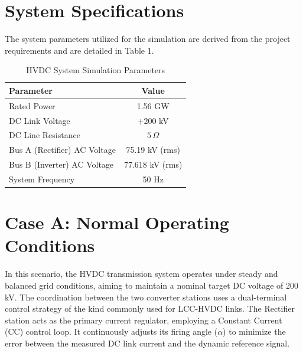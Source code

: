 \documentclass[12pt, a4paper]{article}
\begin{document}
\newpage

\begin{abstract}
	This report presents the modeling and simulation of a 1.56 GW, 200 kV 12-pulse Line-Commutated Converter (LCC) HVDC transmission system. The study evaluates the system's dynamic performance under normal operating conditions utilizing Constant Current (CC) and Constant Extinction Angle (CEA) control strategies. Furthermore, the system's resilience is tested under a severe 25\% AC voltage sag at the rectifier side, demonstrating a successful automated control handover mechanism to Constant Ignition Angle (CIA) and Inverter CC mode.
\end{abstract}

\newpage
\tableofcontents
\newpage

\section{System Specifications}
The system parameters utilized for the simulation are derived from the project requirements and are detailed in Table 1.

\begin{table}[H]
	\centering
	\caption{HVDC System Simulation Parameters}
	\begin{tabular}{lc}
		\hline
		\textbf{Parameter} & \textbf{Value} \\
		\hline
		Rated Power & 1.56 GW \\
		DC Link Voltage & +200 kV \\
		DC Line Resistance & $5\,\Omega$ \\
		Bus A (Rectifier) AC Voltage & 75.19 kV (rms) \\
		Bus B (Inverter) AC Voltage & 77.618 kV (rms) \\
		System Frequency & 50 Hz \\
		\hline
	\end{tabular}
\end{table}

\section{Case A: Normal Operating Conditions}
In this scenario, the HVDC transmission system operates under steady and balanced grid conditions, aiming to maintain a nominal target DC voltage of 200 kV. The coordination between the two converter stations uses a dual-terminal control strategy of the kind commonly used for LCC-HVDC links. The Rectifier station acts as the primary current regulator, employing a Constant Current (CC) control loop. It continuously adjusts its firing angle ($\alpha$) to minimize the error between the measured DC link current and the dynamic reference signal. 
\end{document}
